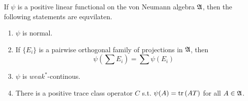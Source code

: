 \begin{thm}
	If $\psi$ is a positive linear functional on the von Neumann algebra $\mathfrak{A}$, then the following statements are equvilaten.
	\begin{enumerate}[label = \arabic*)]
		\item $\psi$ is normal.
		\item If $\{E_i\}$ is a pairwise orthogonal family of projections in $\mathfrak{A}$, then 
		\begin{equation*}
			\psi(\sum E_i) = \sum \psi(E_i)
		\end{equation*}
		\item $\psi$ is $weak^*$-continous.
		\item There is a positive trace class operator $C$ s.t. $\psi(A) = \operatorname{tr}{(AT)}$ for all $A \in \mathfrak{A}$.
	\end{enumerate}
\end{thm}
